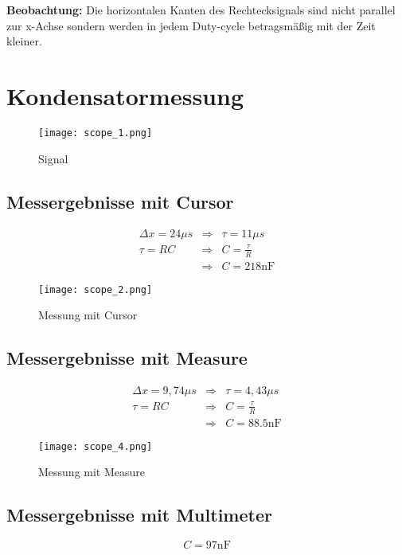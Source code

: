 \documentclass[10pt]{report}
\begin{document}
         \noindent \textbf{Beobachtung:} Die horizontalen Kanten des Rechtecksignals sind nicht parallel
         zur x-Achse sondern werden in jedem Duty-cycle betragsmäßig mit der Zeit kleiner.

         \section{Kondensatormessung}
         \begin{figure}
          \texttt{[image: scope\_1.png]}
          \caption{Signal}
        \end{figure}
        \subsection{Messergebnisse mit Cursor}
        \begin{eqnarray*}
            \Delta x = 24 \mu s &\Rightarrow& \tau =  11 \mu s \\
            \tau = RC &\Rightarrow& C = \frac{\tau}{R}\\
            &\Rightarrow& C=218\text{nF}
        \end{eqnarray*}
        \begin{figure}
         \texttt{[image: scope\_2.png]}
         \caption{Messung mit Cursor}
       \end{figure}

       \subsection{Messergebnisse mit Measure}
       \begin{eqnarray*}
           \Delta x = 9,74 \mu s &\Rightarrow& \tau =  4,43 \mu s \\
           \tau = RC &\Rightarrow& C = \frac{\tau}{R}\\
           &\Rightarrow& C=88.5\text{nF}
       \end{eqnarray*}
       \begin{figure}
        \texttt{[image: scope\_4.png]}
        \caption{Messung mit Measure}
      \end{figure}

      \subsection{Messergebnisse mit Multimeter}
      \begin{equation*}
          C = 97\text{nF}
      \end{equation*}
\end{document}
